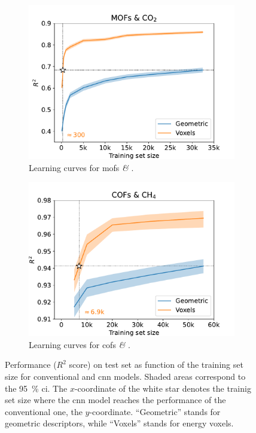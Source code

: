 \begin{figure}
	\centering
	\begin{subfigure}[b]{0.49\textwidth}
		\includegraphics[width=\textwidth]{fig/learning_curves_mofs.pdf}
		\caption{Learning curves for \glspl{mof} \textit{\&} .}
		\label{fig:learning_curves_mofs}
	\end{subfigure}
	\begin{subfigure}[b]{0.49\textwidth}
		\includegraphics[width=\textwidth]{fig/learning_curves_cofs.pdf}
		\caption{Learning curves for \glspl{cof} \textit{\&} .}
		\label{fig:learning_curves_cofs}
	\end{subfigure}
	\caption[Learning curves.]{Performance ($R^2$ score) on test set as function
	of the training set size for conventional and \gls{cnn} models. Shaded areas
	correspond to the \SI{95}{\percent} \gls{ci}. The
	$x$-coordinate of the white star denotes the trainig set size where the
	\gls{cnn} model reaches the performance of the conventional one, the
	$y$-coordinate. ``Geometric'' stands for geometric descriptors, while
	``Voxels'' stands for energy voxels.}
	\label{fig:learning_curves}
\end{figure}

